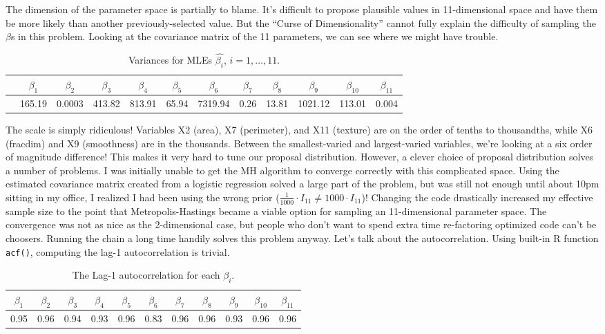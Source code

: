 \documentclass[12pt]{article}
\begin{document}
The dimension of the parameter space is partially to blame. It's difficult to propose plausible values in 11-dimensional space and have them be more likely than another previously-selected value. But the ``Curse of Dimensionality'' cannot fully explain the difficulty of sampling the $\beta$s in this problem. Looking at the covariance matrix of the 11 parameters, we can see where we might have trouble.
\begin{table}[H] \center 
\begin{tabular}{|cccccccccccc|} \hline
& $\beta_1$ & $\beta_2$ & $\beta_3$ & $\beta_4$ & $\beta_5$ & $\beta_6$ & $\beta_7$ & $\beta_8$ & $\beta_9$ & $\beta_{10}$ & $\beta_{11}$ \\ \hline
& 165.19 & 0.0003 & 413.82 & 813.91 & 65.94 & 7319.94 & 0.26 & 13.81 & 1021.12 & 113.01 & 0.004 \\ \hline
\end{tabular}
\caption*{Variances for MLEs $\hat{\beta_i}$, $i=1, \dots, 11$.}
\end{table}
The scale is simply ridiculous! Variables X2 (area), X7 (perimeter), and X11 (texture) are on the order of tenths to thousandths, while X6 (fracdim) and X9 (smoothness) are in the thousands. Between the smallest-varied and largest-varied variables, we're looking at a six order of magnitude difference! This makes it very hard to tune our proposal distribution. However, a clever choice of proposal distribution solves a number of problems. I was initially unable to get the MH algorithm to converge correctly with this complicated space. Using the estimated covariance matrix created from a logistic regression solved a large part of the problem, but was still not enough until about 10pm sitting in my office, I realized I had been using the wrong prior ($\frac{1}{1000} \cdot I_{11} \neq 1000 \cdot I_{11}$)! Changing the code drastically increased my effective sample size to the point that Metropolis-Hastings became a viable option for sampling an 11-dimensional parameter space. The convergence was not as nice as the 2-dimensional case, but people who don't want to spend extra time re-factoring optimized code can't be choosers. Running the chain a long time handily solves this problem anyway.
Let's talk about the autocorrelation. Using built-in R function \texttt{acf()}, computing the lag-1 autocorrelation is trivial.
\begin{table}[H] \center
\begin{tabular}{|ccccccccccc|} \hline
$\beta_1$ & $\beta_2$ & $\beta_3$ & $\beta_4$ & $\beta_5$ & $\beta_6$ & $\beta_7$ & $\beta_8$ & $\beta_9$ & $\beta_{10}$ & $\beta_{11}$ \\ \hline
0.95 & 0.96 & 0.94 & 0.93 & 0.96 & 0.83 & 0.96 & 0.96 & 0.93 & 0.96 & 0.96 \\ \hline
\end{tabular}
\caption*{The Lag-1 autocorrelation for each $\beta_i$.}
\end{table}
\end{document}
